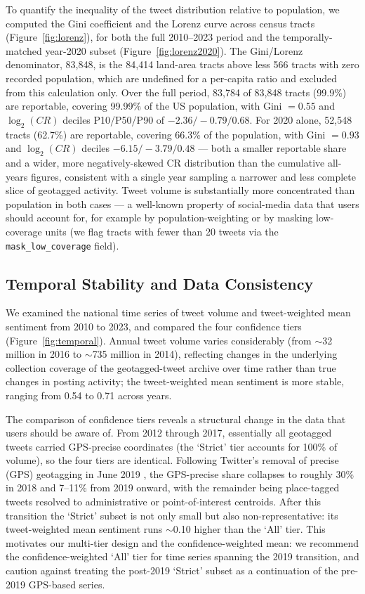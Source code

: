 \documentclass[fleqn,10pt]{wlscirep}
\begin{document}
To quantify the inequality of the tweet distribution relative to population, we computed the Gini coefficient and the Lorenz curve across census tracts (Figure~\ref{fig:lorenz}), for both the full 2010--2023 period and the temporally-matched year-2020 subset (Figure~\ref{fig:lorenz2020}). The Gini/Lorenz denominator, 83,848, is the 84,414 land-area tracts above less 566 tracts with zero recorded population, which are undefined for a per-capita ratio and excluded from this calculation only. Over the full period, 83,784 of 83,848 tracts (99.9\%) are reportable, covering 99.99\% of the US population, with Gini $=0.55$ and $\log_2(CR)$ deciles P10/P50/P90 of $-2.36/-0.79/0.68$. For 2020 alone, 52,548 tracts (62.7\%) are reportable, covering 66.3\% of the population, with Gini $=0.93$ and $\log_2(CR)$ deciles $-6.15/-3.79/0.48$ --- both a smaller reportable share and a wider, more negatively-skewed CR distribution than the cumulative all-years figures, consistent with a single year sampling a narrower and less complete slice of geotagged activity. Tweet volume is substantially more concentrated than population in both cases --- a well-known property of social-media data that users should account for, for example by population-weighting or by masking low-coverage units (we flag tracts with fewer than 20 tweets via the \texttt{mask\_low\_coverage} field).

\subsection*{Temporal Stability and Data Consistency}

We examined the national time series of tweet volume and tweet-weighted mean sentiment from 2010 to 2023, and compared the four confidence tiers (Figure~\ref{fig:temporal}). Annual tweet volume varies considerably (from $\sim$32 million in 2016 to $\sim$735 million in 2014), reflecting changes in the underlying collection coverage of the geotagged-tweet archive over time rather than true changes in posting activity; the tweet-weighted mean sentiment is more stable, ranging from 0.54 to 0.71 across years.

The comparison of confidence tiers reveals a structural change in the data that users should be aware of. From 2012 through 2017, essentially all geotagged tweets carried GPS-precise coordinates (the `Strict' tier accounts for 100\% of volume), so the four tiers are identical. Following Twitter's removal of precise (GPS) geotagging in June 2019 \cite{huUnderstandingRemovalPrecise2020}, the GPS-precise share collapses to roughly 30\% in 2018 and 7--11\% from 2019 onward, with the remainder being place-tagged tweets resolved to administrative or point-of-interest centroids. After this transition the `Strict' subset is not only small but also non-representative: its tweet-weighted mean sentiment runs $\sim$0.10 higher than the `All' tier. This motivates our multi-tier design and the confidence-weighted mean: we recommend the confidence-weighted `All' tier for time series spanning the 2019 transition, and caution against treating the post-2019 `Strict' subset as a continuation of the pre-2019 GPS-based series.
\end{document}
